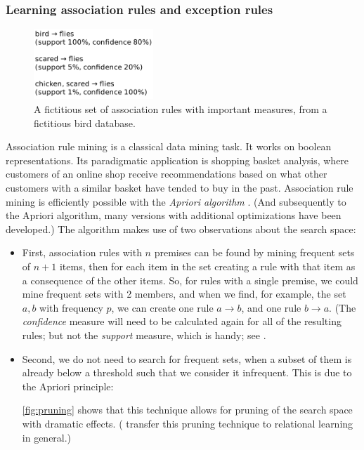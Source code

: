 \subsubsection{Learning association rules and exception rules}\label{sec:association-rules}

\begin{figure}[htb]
        \centering
        \includegraphics[width=0.4\textwidth]{images/association-rules.png}
        \caption{A fictitious set of association rules with important measures, from a fictitious bird database.}
        \label{fig:association-rules}
\end{figure}

Association rule mining is a classical data mining task. It works on boolean representations. Its paradigmatic application is shopping basket analysis, where customers of an online shop receive recommendations based on what other customers with a similar basket have tended to buy in the past. Association rule mining is efficiently possible with the \textit{Apriori algorithm} \citep{agrawalFastAlgorithmsMining1994}. (And subsequently to the Apriori algorithm, many versions with additional optimizations have been developed.) The algorithm makes use of two observations about the search space: 

\begin{itemize}
    \item First, association rules with $n$ premises can be found by mining frequent sets of $n + 1$ items, then for each item in the set creating a rule with that item as a consequence of the other items. So, for rules with a single premise, we could mine frequent sets with 2 members, and when we find, for example, the set ${a, b}$ with frequency $p$, we can create one rule $a \rightarrow b$, and one rule $b \rightarrow a$. (The \textit{confidence} measure will need to be calculated again for all of the resulting rules; but not the \textit{support} measure, which is handy; see \citet[p.~350]{tanIntroductionDataMining2014}.
    
    \item Second, we do not need to search for frequent sets, when a subset of them is already below a threshold such that we consider it infrequent. This is due to the Apriori principle:  \citep[p.~333]{tanIntroductionDataMining2014} 
    
    \autoref{fig:pruning} shows that this technique allows for pruning of the search space with dramatic effects. (\citet{deraedtLogicalRelationalLearning2008} transfer this pruning technique to relational learning in general.)
\end{itemize}

